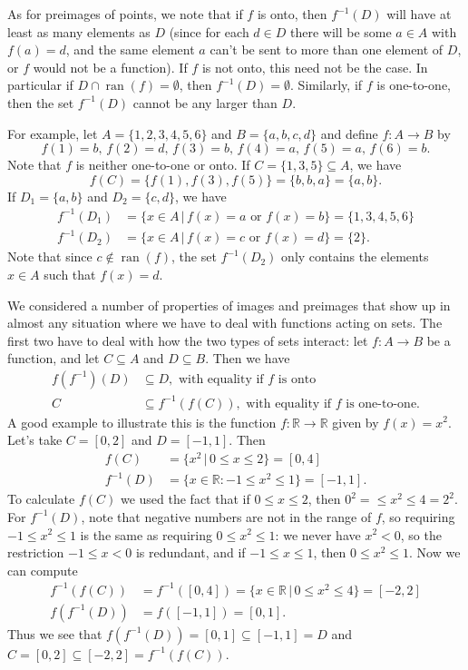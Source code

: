 \documentclass[letterpaper,12pt]{article}
\newcommand{\R}{\mathbb{R}}
\DeclareMathOperator{\ran}{ran}
\begin{document}
As for preimages of points, we note that if $f$ is onto, then $f^{-1}(D)$ will have at least as many elements as $D$ (since for each $d\in D$ there will be some $a\in A$ with $f(a)=d$, and the same element $a$ can't be sent to more than one element of $D$, or $f$ would not be a function). If $f$ is not onto, this need not be the case. In particular if $D\cap \ran(f) = \emptyset$, then $f^{-1}(D) = \emptyset$. Similarly, if $f$ is one-to-one, then the set $f^{-1}(D)$ cannot be any larger than $D$.

For example, let $A = \{1,2,3,4,5,6\}$ and $B=\{a,b,c,d\}$ and define $f:A\to B$ by
\[
 f(1) = b,\, f(2) = d,\, f(3) = b,\, f(4) = a,\, f(5) = a,\, f(6) = b.
\]
Note that $f$ is neither one-to-one or onto. If $C = \{1,3,5\}\subseteq A$, we have
\[
 f(C) = \{f(1),f(3),f(5)\} = \{b,b,a\} = \{a,b\}.
\]
If $D_1 = \{a,b\}$ and $D_2 = \{c,d\}$, we have
\begin{align*}
 f^{-1}(D_1) &= \{x\in A \,| \, f(x) = a \text{ or } f(x) = b\} = \{1,3,4,5,6\}\\
 f^{-1}(D_2) &= \{x\in A \,| \, f(x) = c \text{ or } f(x) = d\} = \{2\}.
\end{align*}
Note that since $c\notin\ran(f)$, the set $f^{-1}(D_2)$ only contains the elements $x\in A$ such that $f(x)=d$.

We considered a number of properties of images and preimages that show up in almost any situation where we have to deal with functions acting on sets. The first two have to deal with how the two types of sets interact: let $f:A\to B$ be a function, and let $C\subseteq A$ and $D\subseteq B$. Then we have
\begin{align*}
 f(f^{-1})(D) & \subseteq D, \text{ with equality if } f \text{ is onto}\\
 C& \subseteq f^{-1}(f(C)), \text{ with equality if } f \text{ is one-to-one.}
\end{align*}
A good example to illustrate this is the function $f:\R\to\R$ given by $f(x)=x^2$. Let's take $C = [0,2]$ and $D=[-1,1]$. Then 
\begin{align*}
 f(C) &= \{x^2 \,|\, 0\leq x\leq 2\} = [0,4]\\
 f^{-1}(D) & = \{x\in\R : -1\leq x^2\leq 1\} = [-1,1].
\end{align*}
To calculate $f(C)$ we used the fact that if $0\leq x\leq 2$, then $0^2=\leq x^2\leq 4=2^2$. For $f^{-1}(D)$, note that negative numbers are not in the range of $f$, so requiring $-1\leq x^2\leq 1$ is the same as requiring $0\leq x^2\leq 1$: we never have $x^2<0$, so the restriction $-1\leq x<0$ is redundant, and if $-1\leq x\leq 1$, then $0\leq x^2\leq 1$. Now we can compute
\begin{align*}
 f^{-1}(f(C)) & = f^{-1}([0,4]) = \{x\in \R \,|\, 0\leq x^2\leq 4\} = [-2,2]\\
 f(f^{-1}(D)) & = f([-1,1]) = [0,1].
\end{align*}
Thus we see that $f(f^{-1}(D)) = [0,1]\subseteq [-1,1]=D$ and $C = [0,2] \subseteq [-2,2] = f^{-1}(f(C))$.
\end{document}
